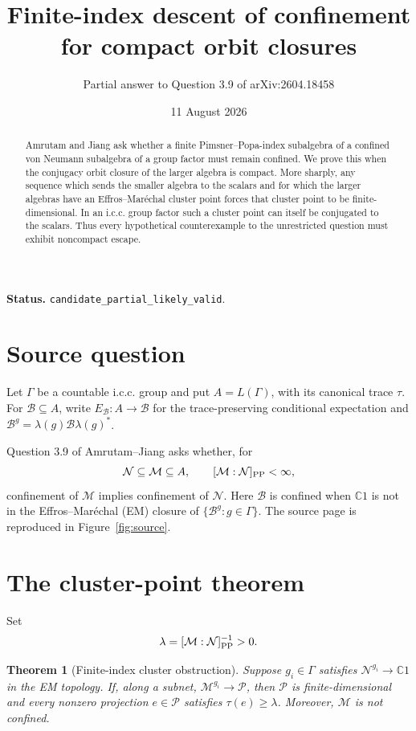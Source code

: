 \documentclass[11pt]{article}
\title{Finite-index descent of confinement for compact orbit closures}
\author{Partial answer to Question 3.9 of arXiv:2604.18458}
\date{11 August 2026}
\newtheorem{theorem}{Theorem}
\newcommand{\C}{\mathbb C}
\begin{document}
\maketitle

\noindent\textbf{Status.} \texttt{candidate\_partial\_likely\_valid}.

\begin{abstract}
Amrutam and Jiang ask whether a finite Pimsner--Popa-index subalgebra of a
confined von Neumann subalgebra of a group factor must remain confined. We
prove this when the conjugacy orbit closure of the larger algebra is compact.
More sharply, any sequence which sends the smaller algebra to the scalars and
for which the larger algebras have an Effros--Mar\'echal cluster point forces
that cluster point to be finite-dimensional. In an i.c.c. group factor such a
cluster point can itself be conjugated to the scalars. Thus every hypothetical
counterexample to the unrestricted question must exhibit noncompact escape.
\end{abstract}

\section{Source question}

Let \(\Gamma\) be a countable i.c.c. group and put \(A=L(\Gamma)\), with its
canonical trace \(\tau\). For \(\mathcal B\subseteq A\), write
\(E_{\mathcal B}:A\to\mathcal B\) for the trace-preserving conditional
expectation and \(\mathcal B^g=\lambda(g)\mathcal B\lambda(g)^*\).

Question 3.9 of Amrutam--Jiang \cite{source} asks whether, for
\[
 \mathcal N\subseteq\mathcal M\subseteq A,
 \qquad [\mathcal M:\mathcal N]_{\rm PP}<\infty,
\]
confinement of \(\mathcal M\) implies confinement of \(\mathcal N\). Here
\(\mathcal B\) is confined when \(\C1\) is not in the Effros--Mar\'echal (EM)
closure of \(\{\mathcal B^g:g\in\Gamma\}\). The source page is reproduced in
Figure~\ref{fig:source}.

\section{The cluster-point theorem}

Set
\[
 \lambda=[\mathcal M:\mathcal N]_{\rm PP}^{-1}>0.
\]

\begin{theorem}[Finite-index cluster obstruction]\label{thm:cluster}
Suppose \(g_i\in\Gamma\) satisfies
\(\mathcal N^{g_i}\to\C1\) in the EM topology. If, along a subnet,
\(\mathcal M^{g_i}\to\mathcal P\), then \(\mathcal P\) is finite-dimensional
and every nonzero projection \(e\in\mathcal P\) satisfies
\(\tau(e)\geq\lambda\). Moreover, \(\mathcal M\) is not confined.
\end{theorem}
\end{document}
